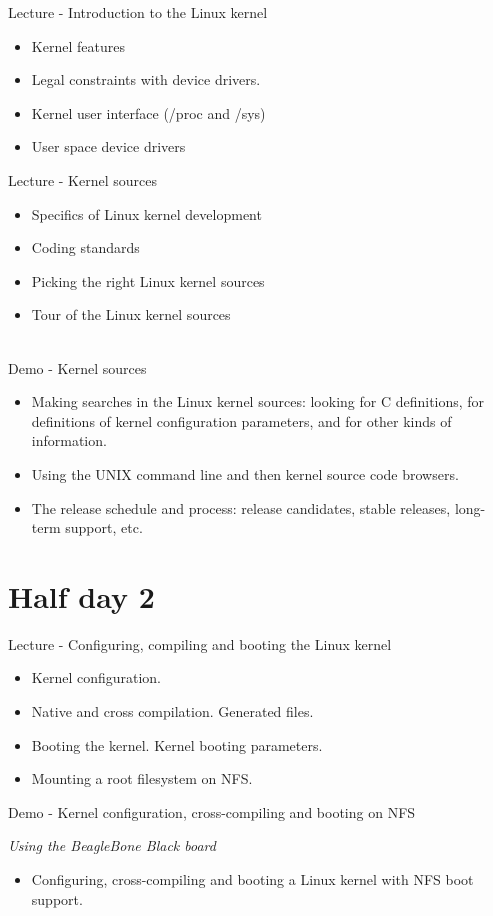 \documentclass[a4paper,12pt,obeyspaces,spaces,hyphens]{article}
\begin{document}
\feagendatwocolumn
{Lecture - Introduction to the Linux kernel}
{
  \begin{itemize}
  \item Kernel features
  \item Legal constraints with device drivers.
  \item Kernel user interface (/proc and /sys)
  \item User space device drivers
  \end{itemize}
}
{Lecture - Kernel sources}
{
  \begin{itemize}
  \item Specifics of Linux kernel development
  \item Coding standards
  \item Picking the right Linux kernel sources
  \item Tour of the Linux kernel sources
  \end{itemize}
}
\\
\feagendaonecolumn
{Demo - Kernel sources}
{
  \begin{itemize}
  \item Making searches in the Linux kernel sources: looking for C
    definitions, for definitions of kernel configuration parameters,
    and for other kinds of information.
  \item Using the UNIX command line and then kernel source code
    browsers.
  \item The release schedule and process: release candidates, stable
    releases, long-term support, etc.
  \end{itemize}
}

\section{Half day 2}

\feagendatwocolumn
{Lecture - Configuring, compiling and booting the Linux kernel}
{
  \begin{itemize}
  \item Kernel configuration.
  \item Native and cross compilation. Generated files.
  \item Booting the kernel. Kernel booting parameters.
  \item Mounting a root filesystem on NFS.
  \end{itemize}
}
{Demo - Kernel configuration, cross-compiling and booting on NFS}
{
  {\em Using the BeagleBone Black board}
  \begin{itemize}
  \item Configuring, cross-compiling and booting a Linux kernel with
    NFS boot support.
  \end{itemize}
}
\end{document}
